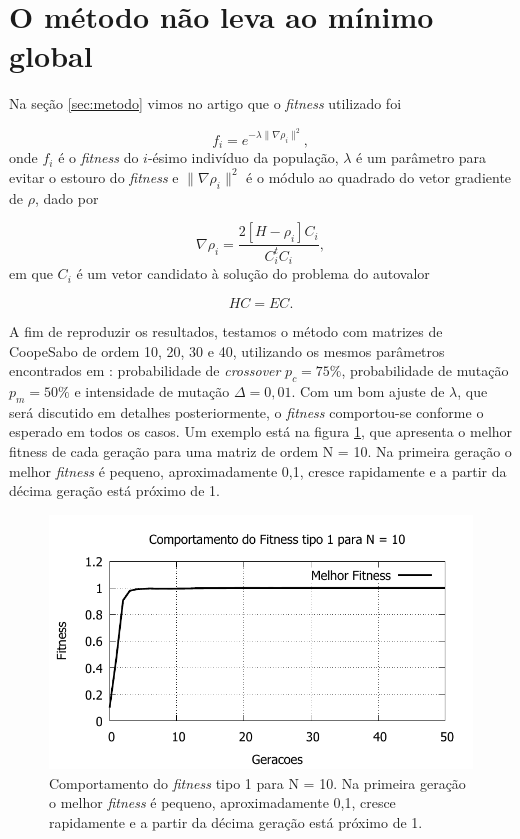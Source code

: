 \section{O método não leva ao mínimo global}	
	
	Na seção \ref{sec:metodo} vimos no artigo \cite{metodo2004} que o \textit{fitness} utilizado foi
	
	\begin{equation}
		\label{eq:fitnessGrad2}
		f_i = e^{-\lambda \| \nabla \rho_i \|^2},
	\end{equation}
	onde $f_i$ é o \textit{fitness} do $i$-ésimo indivíduo da população, $\lambda$ é um parâmetro para evitar o estouro do \textit{fitness} e $\| \nabla \rho_i\|^2$ é o módulo ao quadrado do vetor gradiente de $\rho$, dado por
		
				\begin{equation}
					\nabla \rho_i = \frac{2[H - \rho_i]C_i}{C_i^t C_i},
				\end{equation}
	em que $C_i$ é um vetor candidato à solução do problema do autovalor
	
	\begin{equation}
		HC = EC.
	\end{equation}
	
	A fim de reproduzir os resultados, testamos o método com matrizes de Coope\-Sabo de ordem 10, 20, 30 e 40, utilizando os mesmos parâmetros encontrados em \cite{metodo2004}: probabilidade de \textit{crossover} $p_c = 75\%$, probabilidade de mutação $p_m = 50\%$ e intensidade de mutação $\Delta = 0,01$. Com um bom ajuste de $\lambda$, que será discutido em detalhes posteriormente, o \textit{fitness} comportou-se conforme o esperado em todos os casos. Um exemplo está na figura \ref{fig:compFitnessTipo1N10}, que apresenta o melhor fitness de cada geração para uma matriz de ordem N = 10. Na primeira geração o melhor \textit{fitness} é pequeno, aproximadamente 0,1, cresce rapidamente e a partir da décima geração está próximo de 1.
	
	\begin{figure}[htbp]
		\centering
			\includegraphics{figs/resultados/compFitnessTipo1N10.pdf}
			\caption{Comportamento do \textsl{fitness} tipo 1 para N = 10. Na primeira geração o melhor \textit{fitness} é pequeno, aproximadamente 0,1, cresce rapidamente e a partir da décima geração está próximo de 1.}
		\label{fig:compFitnessTipo1N10}
	\end{figure}
	
